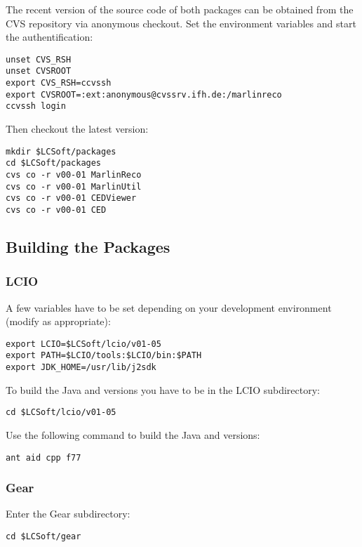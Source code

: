 The recent version of the source code of both packages can be
obtained from the CVS repository via anonymous checkout.
Set the environment variables and start the authentification:

\begin{verbatim}
unset CVS_RSH
unset CVSROOT
export CVS_RSH=ccvssh
export CVSROOT=:ext:anonymous@cvssrv.ifh.de:/marlinreco
ccvssh login
\end{verbatim}

Then checkout the latest version:

\begin{verbatim}
mkdir $LCSoft/packages
cd $LCSoft/packages
cvs co -r v00-01 MarlinReco
cvs co -r v00-01 MarlinUtil
cvs co -r v00-01 CEDViewer
cvs co -r v00-01 CED
\end{verbatim}

\subsection{Building the Packages}

\subsubsection*{LCIO}

A few variables have to be set depending on your development
environment (modify as appropriate):

\begin{verbatim}
export LCIO=$LCSoft/lcio/v01-05
export PATH=$LCIO/tools:$LCIO/bin:$PATH
export JDK_HOME=/usr/lib/j2sdk
\end{verbatim}

To build the Java and \CPP{} versions you have to be in the LCIO subdirectory:

\begin{verbatim}
cd $LCSoft/lcio/v01-05
\end{verbatim}

Use the following command to build the Java and \CPP{} versions:

\begin{verbatim}
ant aid cpp f77
\end{verbatim}

\subsubsection*{Gear}

Enter the Gear subdirectory:

\begin{verbatim}
cd $LCSoft/gear
\end{verbatim}

